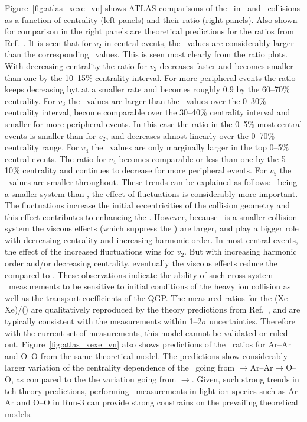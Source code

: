 Figure~\ref{fig:atlas_xexe_vn} shows ATLAS comparisons of the \vn\
  in \xexe\ and \pbpb\ collisions as a function of centrality (left panels)
  and their ratio (right panels).
Also shown for comparison in the right panels are theoretical predictions
  for the ratios from Ref.~\cite{Giacalone:2017dud}.
It is seen that for $v_2$ in central events, the \xexe\ values are
  considerably larger than the corresponding \pbpb\ values.
This is seen most clearly from the ratio plots.
With decreasing centrality the ratio for $v_2$ decreases faster and
  becomes smaller than one by the 10--15\% centrality interval.
For more peripheral events the ratio keeps decreasing byt at a
  smaller rate and becomes roughly 0.9 by the 60--70\% centrality.
For $v_3$ the \xexe\ values are larger than the \pbpb\ values
  over the 0--30\% centrality interval,  become comparable over the
  30--40\% centrality interval and smaller for more peripheral events.
In this case the ratio in the 0--5\% most central events is smaller
  than for $v_2$, and decreases almost linearly over the 0--70\%
  centrality range.
For $v_4$ the \xexe\ values are only marginally larger in the top
  0--5\% central events.
The ratio for $v_4$ becomes comparable or less than one by the
  5--10\% centrality and continues to decrease for
  more peripheral events.
For $v_5$ the \xexe\ values are smaller throughout.
These trends can be explained as follows:
  \xexe\ being a smaller system than \pbpb, the effect of fluctuations
  is considerably more important.
The fluctuations increase the initial eccentricities of the collision
  geometry and this effect contributes to enhancing the \vn.
However, because \xexe\ is a smaller collision system the viscous
  effects (which suppress the \vn) are larger, and play a bigger role
  with decreasing centrality and increasing harmonic order.
In most central events, the effect of the increased fluctuations wins
  for $v_2$.
But with increasing harmonic order and/or decreasing centrality, 
  eventually the viscous effects reduce the \vn compared to \pbpb.
These observations indicate the ability of such cross-system 
  \vn\ measurements to be sensitive to initial conditions of 
  the heavy ion collision as well as the transport coefficients
  of the QGP. 
The measured ratios for the \vn(Xe--Xe)/\vn(\pbpb) are qualitatively reproduced 
  by the theory predictions from Ref.~\cite{Giacalone:2017dud},
	and are typically consistent with the measurements within 1--2$\sigma$
	uncertainties.
Therefore with the current set of measurements, this model cannot be validated
  or ruled out.
Figure~\ref{fig:atlas_xexe_vn} also shows predictions of the \vn\ ratios
  for Ar--Ar and O--O from the same theoretical model.
The predictions show considerably larger variation of the centrality dependence
  of the \vn\ going from \xexe$\rightarrow$Ar--Ar$\rightarrow$O--O, as compared to
	the the variation going from \pbpb$\rightarrow$\xexe.
Given, such strong trends in teh theory predictions, performing \vn\ measurements 
  in light ion species such as Ar--Ar and O--O in Run-3 can provide strong 
  constrains on the prevailing theoretical models.

